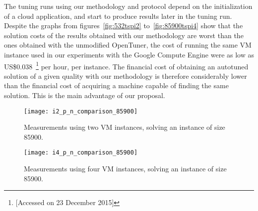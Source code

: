 The tuning runs using our methodology and protocol depend on the initialization
of a cloud application, and start to produce results later in the tuning run.
Despite the graphs from figures~\ref{fig:532tspi2} to~\ref{fig:85900tspi4}
show that the solution costs of the results obtained with our methodology
are worst than the ones obtained with the unmodified OpenTuner, the cost of running the same VM instance used in our experiments
with the Google Compute Engine were as low as
US\$0.038~\footnote{
[Accessed on 23 December 2015]} per hour, per instance. The financial cost of obtaining
an autotuned solution of a given quality with our methodology is therefore
considerably lower than the financial cost of acquiring a machine capable of finding
the same solution. This is the main advantage of our proposal.

\begin{figure}[htpb]
    \centering
    \begin{minipage}{.48\textwidth}
        \centering
        \texttt{[image: i2\_p\_n\_comparison\_85900]}
        \caption{Measurements using two VM instances,
                 solving an instance of size 85900.}
        \label{fig:85900tspi2}
    \end{minipage}%
    \hfill
    \begin{minipage}{.48\textwidth}
        \centering
        \texttt{[image: i4\_p\_n\_comparison\_85900]}
        \caption{Measurements using four VM instances,
                 solving an instance of size 85900.}
        \label{fig:85900tspi4}
    \end{minipage}%
    \label{fig:85900tsp}
\end{figure}
